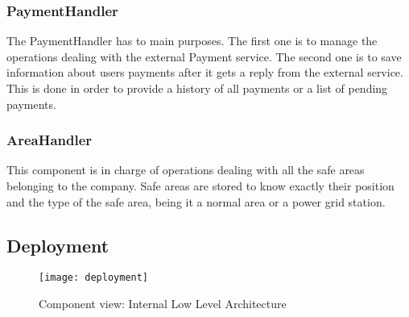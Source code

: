 \subsubsection{PaymentHandler}
The PaymentHandler has to main purposes. The first one is to manage the operations dealing
with the external Payment service. The second one is to save information about users payments
after it gets a reply from the external service. 
This is done in order to provide a history of all payments or a list of pending payments.


\subsubsection{AreaHandler}
This component is in charge of operations dealing with all the safe areas belonging to the company.
Safe areas are stored to know exactly their position and the type of the safe area, being it
a normal area or a power grid station.

\subsection{Deployment}
\begin{sidewaysfigure}
\centering
\texttt{[image: deployment]}
\caption{Component view: Internal Low Level Architecture}
\label{fig:depl}
\end{sidewaysfigure}

